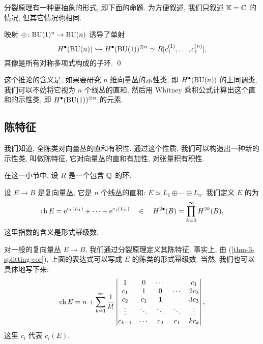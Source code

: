 分裂原理有一种更抽象的形式, 即下面的命题.
为方便叙述, 我们只叙述 $\mathbb{K} = \mathbb{C}$ 的情况,
但其它情况也相同.

\begin{corollary} \label{thm-3-splitting-cor}
    映射 $\oplus \colon \mathrm{B} \mathrm{U} (1)^n \to \mathrm{B} \mathrm{U} (n)$
    诱导了单射
    \[ H^\bullet (\mathrm{B} \mathrm{U} (n)) 
        \hookrightarrow H^\bullet (\mathrm{B} \mathrm{U} (1))^{\otimes n} 
        \simeq R [c_1^{(1)}, \dotsc, c_1^{(n)}], \]
    其像是所有对称多项式构成的子环. \qed
\end{corollary}

这个推论的含义是, 如果要研究 $n$ 维向量丛的示性类,
即 $H^\bullet (\mathrm{B} \mathrm{U} (n))$ 的上同调类,
我们可以不妨将它视为 $n$ 个线丛的直和,
然后用 Whitney 乘积公式计算出这个直和的示性类,
即 $H^\bullet (\mathrm{B} \mathrm{U} (1))^{\otimes n}$ 的元素.

\subsection{陈特征}

我们知道, 全陈类对向量丛的直和有积性.
通过这个性质, 我们可以构造出一种新的示性类, 叫做陈特征,
它对向量丛的直和有加性, 对张量积有积性.

在这一小节中, 设 $R$ 是一个包含 $\mathbb{Q}$ 的环.

\begin{definition} \label{def-3-ch}
    设 $E \to B$ 是复向量丛,
    它是 $n$ 个线丛的直和: $E \simeq L_1 \oplus \cdots \oplus L_n$.
    我们定义 $E$ 的为
    \[ \operatorname{ch} E = \mathrm{e}^{c_1 (L_1)} + \cdots + \mathrm{e}^{c_1 (L_n)}
        \quad \in \quad H^{2\bullet} (B) = \prod_{k = 0}^{\infty} H^{2k} (B), \]
    这里指数的含义是形式幂级数.
    
    对一般的复向量丛 $E \to B$,
    我们通过分裂原理定义其陈特征.
    事实上, 由 (\ref{thm-3-splitting-cor}),
    上面的表达式可以写成 $E$ 的陈类的形式幂级数.
    当然, 我们也可以具体地写下来:
    \[
        \operatorname{ch} E =
        n + \sum_{k = 1}^{\infty} \frac{1}{k!}
        \left| \begin{matrix}
            1 & 0 & \cdots &   & c_1 \\
            c_1 & 1 & 0 & \cdots & 2c_2 \\
            c_2 & c_1 & 1 &   & 3c_3 \\
            \vdots & \ddots & \ddots & \ddots & \vdots \\
            c_{k-1} & \cdots & c_2 & c_1 & kc_k 
        \end{matrix} \right|,
    \]
    这里 $c_i$ 代表 $c_i(E)$.
\end{definition}

